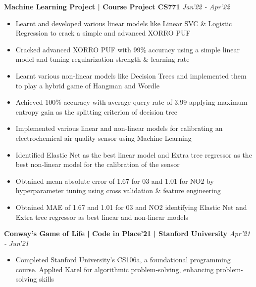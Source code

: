 \documentclass[10pt]{extarticle}
\begin{document}
{\begin{flushleft}
\begin{itemize}
\end{itemize}
\begin{tcolorbox}[center, width=20.7cm, colback=black!10]
\textbf{Machine Learning Project | Course Project CS771}  \hfill\hfill\textcolor{black!80}{\small \textit{Jan'22 - Apr'22}}
\end{tcolorbox}
\vspace{-10pt}
\begin{itemize}
\vspace{2.0mm}
    \item Learnt and developed various linear models like Linear SVC \& Logistic Regression to crack a simple and advanced XORRO PUF
\item Cracked advanced XORRO PUF with 99\% accuracy using a simple linear model and tuning regularization strength \& learning rate
\item Learnt various non-linear models like Decision Trees and implemented them to play a hybrid game of Hangman and Wordle
\item Achieved 100\% accuracy with average query rate of 3.99 applying maximum entropy gain as the splitting criterion of decision tree
\item Implemented various linear and non-linear models for calibrating an electrochemical air quality sensor using Machine Learning
\item Identified Elastic Net as the best linear model and Extra tree regressor as the best non-linear model for the calibration of the sensor
\item Obtained mean absolute error of 1.67 for 03 and 1.01 for NO2 by hyperparameter tuning using cross validation \& feature engineering
\item Obtained MAE of 1.67 and 1.01 for 03 and NO2 identifying Elastic Net and Extra tree regressor as best linear and non-linear models
\end{itemize}
\begin{tcolorbox}[center, width=20.7cm, colback=black!10]
\textbf{Conway's Game of Life | Code in Place'21 | Stanford University}  \hfill\hfill\textcolor{black!80}{\small \href{https://codeinplace-2021.netlify.app/2021/showcase/312}{\faBook} \textit{Apr'21 - Jun'21}}
\end{tcolorbox}
\vspace{-10pt}
\begin{itemize}
\vspace{2.0mm}
    \item Completed Stanford University's CS106a, a foundational programming course. Applied Karel for algorithmic problem-solving, enhancing problem-solving skills

\end{itemize}
\end{flushleft}}
\end{document}
